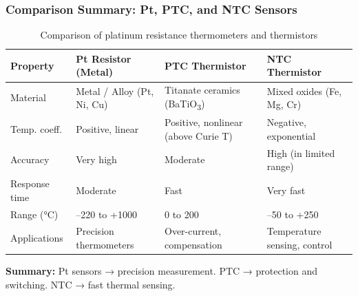 \begin{frame}
	\frametitle{Comparison Summary: Pt, PTC, and NTC Sensors}
    \small
    \begin{table}
        \centering
        \scriptsize
        \begin{tabular}{@{}llll@{}}
            \toprule
            \textbf{Property} & \textbf{Pt Resistor (Metal)} & \textbf{PTC Thermistor} & \textbf{NTC Thermistor} \\
            \midrule
            Material      & Metal / Alloy (Pt, Ni, Cu)              & Titanate ceramics (BaTiO\textsubscript{3})  & Mixed oxides (Fe, Mg, Cr) \\
            Temp. coeff.  & Positive, linear                        & Positive, nonlinear (above Curie T)         & Negative, exponential \\
            Accuracy      & Very high                               & Moderate                                    & High (in limited range) \\
            Response time & Moderate                                & Fast                                        & Very fast \\
            Range (°C)    & --220 to +1000                          & 0 to 200                                    & --50 to +250 \\
            Applications  & Precision thermometers                  & Over-current, compensation                  & Temperature sensing, control \\
            \bottomrule
        \end{tabular}
        \caption{Comparison of platinum resistance thermometers and thermistors}
        \label{tab:resistance_temperature_sensors}
    \end{table}
    \textbf{Summary:}  
    Pt sensors → precision measurement.  
    PTC → protection and switching.  
    NTC → fast thermal sensing.
\end{frame}

